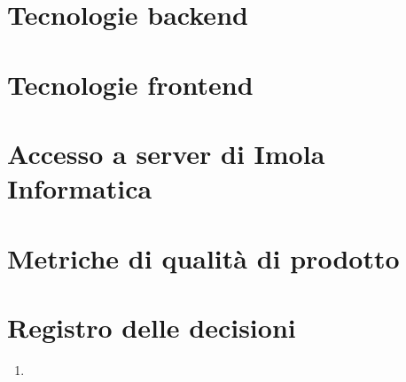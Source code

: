 \documentclass{article}
\begin{document}

\section{Tecnologie backend}%
\label{sec:tecnologie_lato_server}

\placeholder{\dots}


\section{Tecnologie frontend}%
\label{sec:tecnologie_frontend}


\placeholder{\dots}

\section{Accesso a server di Imola Informatica}%
\label{sec:accesso_a_server_di_imola_informatica}

\placeholder{\dots}


\section{Metriche di qualità di prodotto}%
\label{sec:metriche_di_qualita_di_prodotto}

\placeholder{\dots}


\newpage
\section{Registro delle decisioni}%
\label{sec:registro_delle_decisioni}

\begin{enumerate}
  \item \placeholder{\dots}
\end{enumerate}
\end{document}
